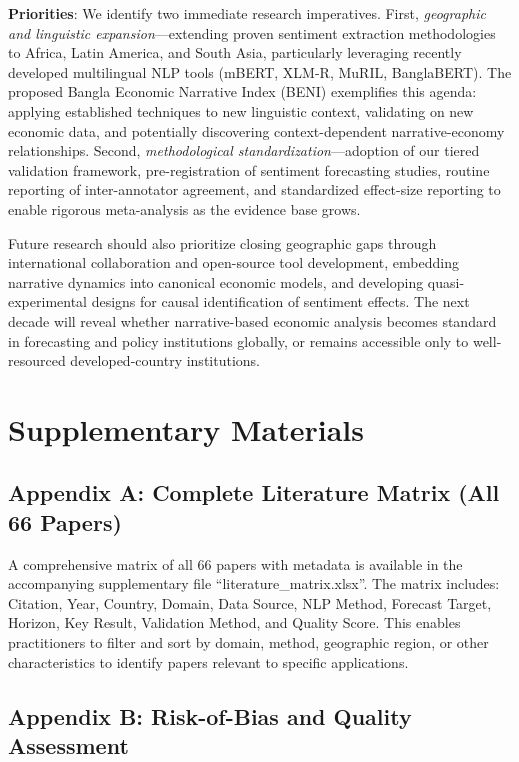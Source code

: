 \documentclass[11pt]{article}
\begin{document}
\textbf{Priorities}: We identify two immediate research imperatives. First, \textit{geographic and linguistic expansion}---extending proven sentiment extraction methodologies to Africa, Latin America, and South Asia, particularly leveraging recently developed multilingual NLP tools (mBERT, XLM-R, MuRIL, BanglaBERT). The proposed Bangla Economic Narrative Index (BENI) exemplifies this agenda: applying established techniques to new linguistic context, validating on new economic data, and potentially discovering context-dependent narrative-economy relationships. Second, \textit{methodological standardization}---adoption of our tiered validation framework, pre-registration of sentiment forecasting studies, routine reporting of inter-annotator agreement, and standardized effect-size reporting to enable rigorous meta-analysis as the evidence base grows.

Future research should also prioritize closing geographic gaps through international collaboration and open-source tool development, embedding narrative dynamics into canonical economic models, and developing quasi-experimental designs for causal identification of sentiment effects. The next decade will reveal whether narrative-based economic analysis becomes standard in forecasting and policy institutions globally, or remains accessible only to well-resourced developed-country institutions.

\appendix

\section{Supplementary Materials}

\subsection*{Appendix A: Complete Literature Matrix (All 66 Papers)}

A comprehensive matrix of all 66 papers with metadata is available in the accompanying supplementary file ``literature\_matrix.xlsx''. The matrix includes: Citation, Year, Country, Domain, Data Source, NLP Method, Forecast Target, Horizon, Key Result, Validation Method, and Quality Score. This enables practitioners to filter and sort by domain, method, geographic region, or other characteristics to identify papers relevant to specific applications.

\subsection*{Appendix B: Risk-of-Bias and Quality Assessment}
\end{document}
